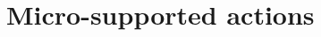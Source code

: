 \documentclass{article}
\theoremstyle{remark}
\theoremstyle{definition}
\newtheorem{nonexample}[theorem]{Non-example}
\newcommand{\remmic}[1]{\textcolor{orange}{MP: #1}}
\newcommand{\repau}[1]{\textcolor{ForestGreen}{PM: #1}}
\DeclareMathOperator{\acl}{acl}
\DeclareMathOperator{\GL}{GL}
\def\Notind#1#2{#1\setbox0=\hbox{$#1x$}\kern\wd0\hbox to 0pt{\mathchardef
		\nn="3236\hss$#1\nn$\kern1.4\wd0\hss}\hbox to
	0pt{\hss$#1\mid$\hss}\lower.9\ht0
	\hbox to 0pt{\hss$#1\smile$\hss}\kern\wd0}
\def\nind{\mathop{\mathpalette\Notind{}}}
\begin{document}
{%

%
\section{Micro-supported actions}\label{sec:micro-supported}

}
\end{document}
